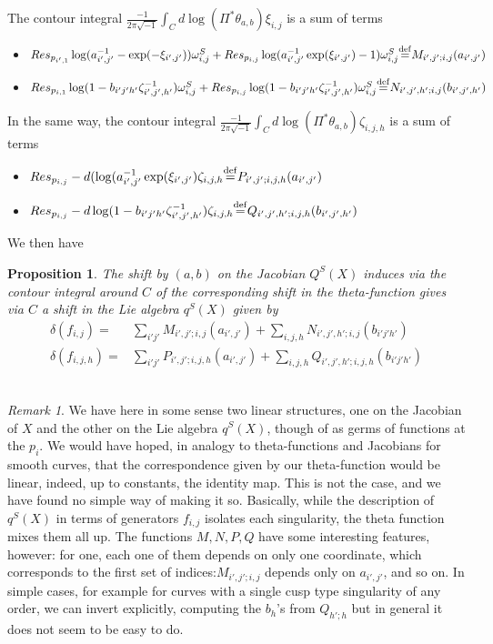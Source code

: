 \documentclass[12pt,reqno]{amsart}
\numberwithin{equation}{section}
\newtheorem{proposition}[theorem]{Proposition}
\theoremstyle{definition}
\theoremstyle{remark}
\newtheorem{remark}[theorem]{Remark}
\begin{document}
The contour integral   $\frac{-1}{2\pi \sqrt{-1}}\int_C d\log (\Pi^*\theta_{a,b})\xi_{i, j}$ is a sum of terms 
\begin{itemize} 
\item $Res_{p_{i',1}}  \log (a_{i',j'}^{-1}-\exp(-\xi_{i',j'} ) )\omega^S_{i, j} + Res_ {p_{i,j}} \log (a_{i',j'}^{-1} \exp(\xi_{i',j'}) -1)\omega^S_{i, j}
{\buildrel {\rm{def}}\over {=}}
M_{i',j';i,j}(a_{i',j'})$
\item $Res_{p_{i,1}}  \log (1-b_{i'j'h'}\zeta_{i',j',h'}^{-1})\omega^S_{i, j} + Res_ {p_{i,j}}  \log (1-b_{i'j'h'}\zeta_{i',j',h'}^{-1})\omega^S_{i, j}
{\buildrel {\rm{def}}\over {=}} 
N_{i',j',h';i,j}(b_{i',j',h'}) $
\end{itemize}
 In the same way, the contour integral   $\frac{-1}{2\pi \sqrt{-1}}\int_C d\log (\Pi^*\theta_{a,b})\zeta_{i, j,h}$ is a sum of terms 
\begin{itemize} 
\item $  Res_ {p_{i,j}}  -d(\log (a_{i',j'}^{-1} \exp(\xi_{i',j'} )\zeta_{i, j,h}{\buildrel {\rm{def}}\over {=}}
P_{i',j';i,j,h}(a_{i',j'})$
\item $ Res_ {p_{i,j}} -d\log (1-b_{i'j'h'}\zeta_{i',j',h'}^{-1})\zeta_{i, j,h}{\buildrel {\rm{def}}\over {=}}
Q_{i',j',h';i,j,h}(b_{i',j',h'}) $
\end{itemize}

We then have 
\begin{proposition}
 The shift by $(a,b)$ on the Jacobian $Q^S(X)$ induces via the contour integral around $C$ of the corresponding shift in the theta-function gives via  $C$ a shift in the Lie algebra $q^S(X)$ given by 
 \begin{align} \delta(f_{i,j}) =&   \sum_{i'j'} M_{i',j';i,j}(a_{i',j'}) + \sum_{i,j,h}N_{i',j',h';i,j}(b_{i'j'h'})\\
 \delta(f_{i,j,h})=&   \sum_{i'j'} P_{i',j';i,j,h}(a_{i',j'}) + \sum_{i,j,h}Q_{i',j',h';i,j,h}(b_{i'j'h'})
 \end{align}\
 \end{proposition}
 
\begin{remark}
We have here in some sense two linear structures, one on the Jacobian of $X$ and the other on 
the Lie algebra $q^S(X)$, though of as germs of functions at the $p_i$. We would have hoped, in analogy to 
theta-functions and Jacobians for smooth curves, that the correspondence given by our theta-function would be 
linear, indeed, up to constants, the identity map. This is not the case, and we have found no simple way of 
making it so. Basically, while the description of $q^S(X)$ in terms of generators $f_{i,j}$ isolates each 
singularity, the theta function mixes them all up. The functions $M,N,P,Q$ have some interesting features, 
however: for one, each one of them depends on only one coordinate, which corresponds to the first set of 
indices:$ M_{i',j';i,j}$ depends only on $a_{i',j'}$, and so on. In simple cases, for example for curves with 
a single cusp type singularity of any order, we can invert explicitly, computing the $b_h$'s from $Q_{ h';h}$ 
but in general it does not seem to be easy to do.
\end{remark}
\end{document}
